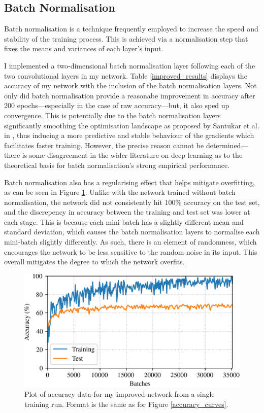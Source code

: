 \documentclass[conference]{IEEEtran}
\begin{document}
\subsection{Batch Normalisation}

Batch normalisation \cite{IoffeSzegedy} is a technique frequently employed to increase the speed and stability of the training process.
This is achieved via a normalisation step that fixes the means and variances of each layer's input.

I implemented a two-dimensional batch normalisation layer following each of the two convolutional layers in my network.
Table \ref{improved_results} displays the accuracy of my network with the inclusion of the batch normalisation layers.
Not only did batch normalisation provide a reasonabe improvement in accuracy after 200 epochs---especially in the case of raw accuracy---but, it also sped up convergence.
This is potentially due to the batch normalisation layers significantly smoothing the optimisation landscape as proposed by Santukar et al. in \cite{SanturkarEtAl}, thus inducing a more predictive and stable behaviour of the gradients which facilitates faster training.
However, the precise reason cannot be determined---there is some disagreement in the wider literature on deep learning as to the theoretical basis for batch normalisation's strong empirical performance.

Batch normalisation also has a regularising effect that helps mitigate overfitting, as can be seen in Figure \ref{accuracy_curves_improved}.
Unlike with the network trained without batch normalisation, the network did not consistently hit 100\% accuracy on the test set, and the discrepency in accuracy between the training and test set was lower at each stage.
This is because each mini-batch has a slightly different mean and standard deviation, which causes the batch normalisation layers to normalise each mini-batch slightly differently.
As such, there is an element of randomness, which encourages the network to be less sensitive to the random noise in its input.
This overall mitigates the degree to which the network overfits.

\begin{figure}[htbp]
    \centerline{\includegraphics[width=\columnwidth]{accuracy_improved.png}}
    \caption{
        Plot of accuracy data for my improved network from a single training run.
        Format is the same as for Figure \ref{accuracy_curves}.
    }
    \label{accuracy_curves_improved}
\end{figure}
\end{document}
